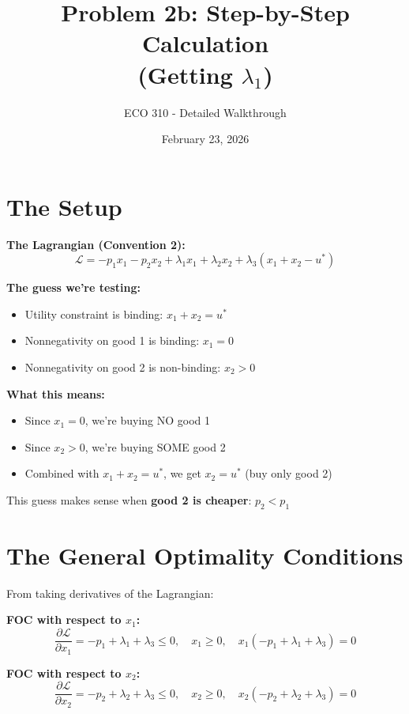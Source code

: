 \documentclass[11pt]{article}
\title{Problem 2b: Step-by-Step Calculation \\ (Getting $\lambda_1$)}
\author{ECO 310 - Detailed Walkthrough}
\date{February 23, 2026}
\begin{document}
\maketitle

\section{The Setup}

\textbf{The Lagrangian (Convention 2):}
\begin{equation}
\mathcal{L} = -p_1 x_1 - p_2 x_2 + \lambda_1 x_1 + \lambda_2 x_2 + \lambda_3(x_1 + x_2 - u^*)
\end{equation}

\textbf{The guess we're testing:}
\begin{itemize}
\item Utility constraint is binding: $x_1 + x_2 = u^*$
\item Nonnegativity on good 1 is binding: $x_1 = 0$
\item Nonnegativity on good 2 is non-binding: $x_2 > 0$
\end{itemize}

\textbf{What this means:}
\begin{itemize}
\item Since $x_1 = 0$, we're buying NO good 1
\item Since $x_2 > 0$, we're buying SOME good 2
\item Combined with $x_1 + x_2 = u^*$, we get $x_2 = u^*$ (buy only good 2)
\end{itemize}

This guess makes sense when \textbf{good 2 is cheaper}: $p_2 < p_1$

\section{The General Optimality Conditions}

From taking derivatives of the Lagrangian:

\textbf{FOC with respect to $x_1$:}
\begin{equation}
\frac{\partial \mathcal{L}}{\partial x_1} = -p_1 + \lambda_1 + \lambda_3 \leq 0, \quad x_1 \geq 0, \quad x_1(-p_1 + \lambda_1 + \lambda_3) = 0
\end{equation}

\textbf{FOC with respect to $x_2$:}
\begin{equation}
\frac{\partial \mathcal{L}}{\partial x_2} = -p_2 + \lambda_2 + \lambda_3 \leq 0, \quad x_2 \geq 0, \quad x_2(-p_2 + \lambda_2 + \lambda_3) = 0
\end{equation}
\end{document}

